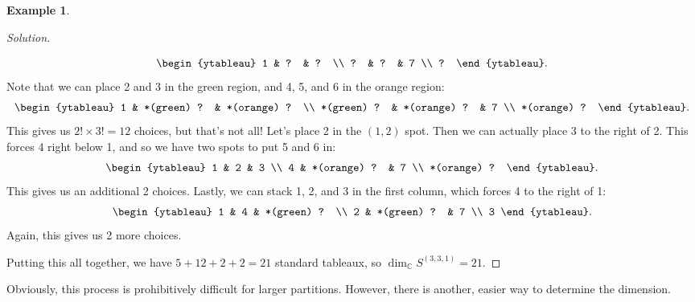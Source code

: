\documentclass[12pt]{article}
\newcommand{\cx}{\mathbb{C}}
\theoremstyle{definition}
\newtheorem{example}{Example}[section]
\begin{document}
\begin{example}
\begin{proof}[Solution]
\begin{itemize}
\begin{equation*}
                \begin{ytableau}
                    1 & ?  & ?  \\
                    ? & ?  & 7  \\
                    ?
                \end{ytableau}.
            \end{equation*}
            Note that we can place 2 and 3 in the green region, and 4, 5, and 6 in the orange region:
            \begin{equation*}
                \begin{ytableau}
                    1 & *(green) ? & *(orange) ?  \\
                    *(green) ? & *(orange) ? & 7  \\
                    *(orange) ?
                \end{ytableau}.
            \end{equation*}
            This gives us $2! \times 3! = 12$ choices, but that's not all! Let's place 2 in the $(1,2)$ spot. Then we can actually place 3 to the right of 2. This forces 4 right below 1, and so we have two spots to put 5 and 6 in:
            \begin{equation*}
                \begin{ytableau}
                    1 & 2 & 3  \\
                    4 & *(orange) ? & 7  \\
                    *(orange) ?
                \end{ytableau}.
            \end{equation*}
            This gives us an additional 2 choices. Lastly, we can stack 1, 2, and 3 in the first column, which forces 4 to the right of 1:
            \begin{equation*}
                \begin{ytableau}
                    1 & 4 & *(green) ?  \\
                    2 & *(green) ? & 7  \\
                    3
                \end{ytableau}.
            \end{equation*}
            Again, this gives us 2 more choices.
        \end{itemize}
        Putting this all together, we have $5 + 12 + 2 + 2 = \boxed{21}$ standard tableaux, so $\dim_{\cx} S^{(3,3,1)} = 21$. 
    \end{proof}
    Obviously, this process is prohibitively difficult for larger partitions. However, there is another, easier way to determine the dimension.
\end{example}
\end{document}
